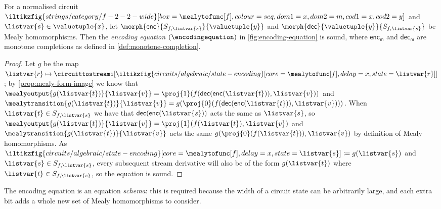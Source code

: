 \begin{proposition}\label{prop:encoding-equation}
    For a normalised circuit \(
    \iltikzfig{strings/category/f-2-2-wide}[box=\mealytofunc[f],colour=seq,dom1=x,dom2=m,cod1=x,cod2=y]
    \) and \(\listvar{s} \in \valuetuple{x}\), let
    \(\morph{\mathsf{enc}}{S_{f,\listvar{s}}}{\valuetuple{y}}\) and
    \(\morph{\mathsf{dec}}{\valuetuple{y}}{S_{f, \listvar{s}}}\) be Mealy
    homomorphisms.
    Then the \emph{encoding equation} \((\encodingequation)\) in
    \cref{fig:encoding-equation} is sound, where
    \(\mathsf{enc}_\mathsf{m}\) and \(\mathsf{dec}_\mathsf{m}\) are monotone
    completions as defined in \cref{def:monotone-completion}.
\end{proposition}
\begin{proof}
    Let \(g\) be the map \(\listvar{r} \mapsto
    \circuittostreami[\iltikzfig{circuits/algebraic/state-encoding}[core=\mealytofunc[f],delay=x,state=\listvar{r}]]
    \); by \cref{prop:mealy-form-image} we know that \(
    \mealyoutput{g(\listvar{t})}{\listvar{v}}
    =
    \proj{1}(f(\mathsf{dec}(\mathsf{enc}(\listvar{t})), \listvar{v}))
    \) and \(
    \mealytransition{g(\listvar{t})}{\listvar{v}}
    =
    g(\proj{0}(f(\mathsf{dec}(\mathsf{enc}(\listvar{t})), \listvar{v})))
    \).
    When \(\listvar{t} \in S_{f, \listvar{s}}\) we have that \(
    \mathsf{dec}(\mathsf{enc}(\listvar{s}))\) acts the same as
    \(\listvar{s}\),
    so
    \(
    \mealyoutput{g(\listvar{t})}{\listvar{v}}
    =
    \proj{1}(f(\listvar{t}), \listvar{v})
    \) and \(
    \mealytransition{g(\listvar{t})}{\listvar{v}}
    \) acts the same \(
    g(\proj{0}(f(\listvar{t})), \listvar{v})
    \) by definition of Mealy homomorphisms.
    As \(
    \iltikzfig{circuits/algebraic/state-encoding}[core=\mealytofunc[f],delay=x,state=\listvar{s}]
    \coloneqq
    g(\listvar{s})
    \) and \(\listvar{s} \in S_{f,\listvar{s}}\),
    every subsequent stream derivative will also be of the form
    \(g(\listvar{t})\) where \(\listvar{t} \in S_{f,\listvar{s}}\), so the
    equation is sound.
\end{proof}

\begin{remark}
    The encoding equation is an equation \emph{schema}: this is required because
    the width of a circuit state can be arbitrarily large, and each extra bit
    adds a whole new set of Mealy homomorphisms to consider.
\end{remark}



